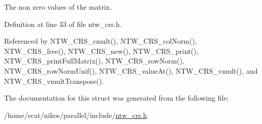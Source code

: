 The non zero values of the matrix. 

Definition at line 33 of file ntw\+\_\+crs.\+h.



Referenced by N\+T\+W\+\_\+\+C\+R\+S\+\_\+cmult(), N\+T\+W\+\_\+\+C\+R\+S\+\_\+col\+Norm(), N\+T\+W\+\_\+\+C\+R\+S\+\_\+free(), N\+T\+W\+\_\+\+C\+R\+S\+\_\+new(), N\+T\+W\+\_\+\+C\+R\+S\+\_\+print(), N\+T\+W\+\_\+\+C\+R\+S\+\_\+print\+Full\+Matrix(), N\+T\+W\+\_\+\+C\+R\+S\+\_\+row\+Norm(), N\+T\+W\+\_\+\+C\+R\+S\+\_\+row\+Norm\+Unif(), N\+T\+W\+\_\+\+C\+R\+S\+\_\+value\+At(), N\+T\+W\+\_\+\+C\+R\+S\+\_\+vmult(), and N\+T\+W\+\_\+\+C\+R\+S\+\_\+vmult\+Transpose().



The documentation for this struct was generated from the following file\+:\begin{DoxyCompactItemize}
\item 
/home/ecat/nikos/parallel/include/\mbox{\hyperlink{ntw__crs_8h}{ntw\+\_\+crs.\+h}}\end{DoxyCompactItemize}
